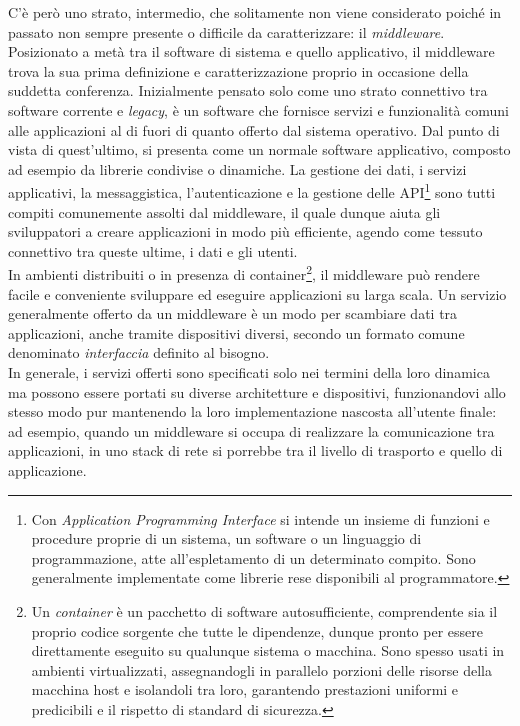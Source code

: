 C'è però uno strato, intermedio, che solitamente non viene considerato poiché in passato non sempre presente o difficile da caratterizzare: il \emph{middleware}. Posizionato a metà tra il software di sistema e quello applicativo, il middleware trova la sua prima definizione e caratterizzazione proprio in occasione della suddetta conferenza. Inizialmente pensato solo come uno strato connettivo tra software corrente e \emph{legacy}, è un software che fornisce servizi e funzionalità comuni alle applicazioni al di fuori di quanto offerto dal sistema operativo. Dal punto di vista di quest’ultimo, si presenta come un normale software applicativo, composto ad esempio da librerie condivise o dinamiche. La gestione dei dati, i servizi applicativi, la messaggistica, l'autenticazione e la gestione delle API\footnote{Con \emph{Application Programming Interface} si intende un insieme di funzioni e procedure proprie di un sistema, un software o un linguaggio di programmazione, atte all'espletamento di un determinato compito. Sono generalmente implementate come librerie rese disponibili al programmatore.} sono tutti compiti comunemente assolti dal middleware, il quale dunque aiuta gli sviluppatori a creare applicazioni in modo più efficiente, agendo come tessuto connettivo tra queste ultime, i dati e gli utenti.\\
In ambienti distribuiti o in presenza di container\footnote{Un \emph{container} è un pacchetto di software autosufficiente, comprendente sia il proprio codice sorgente che tutte le dipendenze, dunque pronto per essere direttamente eseguito su qualunque sistema o macchina. Sono spesso usati in ambienti virtualizzati, assegnandogli in parallelo porzioni delle risorse della macchina host e isolandoli tra loro, garantendo prestazioni uniformi e predicibili e il rispetto di standard di sicurezza.}, il middleware può rendere facile e conveniente sviluppare ed eseguire applicazioni su larga scala. Un servizio generalmente offerto da un middleware è un modo per scambiare dati tra applicazioni, anche tramite dispositivi diversi, secondo un formato comune denominato \emph{interfaccia} definito al bisogno.\\
In generale, i servizi offerti sono specificati solo nei termini della loro dinamica ma possono essere portati su diverse architetture e dispositivi, funzionandovi allo stesso modo pur mantenendo la loro implementazione nascosta all’utente finale: ad esempio, quando un middleware si occupa di realizzare la comunicazione tra applicazioni, in uno stack di rete si porrebbe tra il livello di trasporto e quello di applicazione.\\
